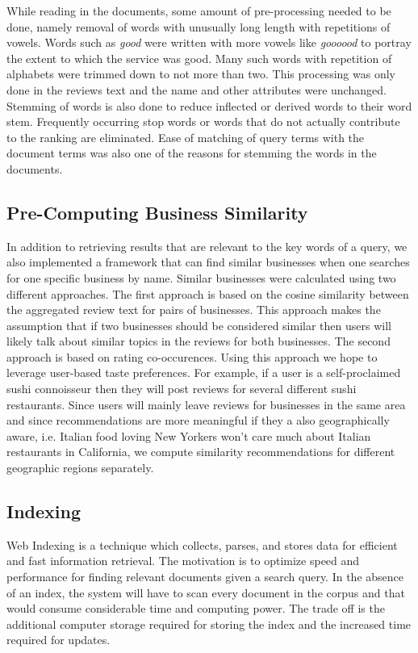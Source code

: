 \documentclass[paper=letter, fontsize=15pt]{article} %
\begin{document}
While reading in the documents, some amount of pre-processing needed to be done, namely removal of words with unusually long length with repetitions of vowels. Words such as \textit{good} were written with more vowels like \textit{goooood} to portray the extent to which the service was good. Many such words with repetition of alphabets were trimmed down to not more than two. This processing was only done in the reviews text and the name and other attributes were unchanged. Stemming\cite{sstem} of words is also done to  reduce inflected or derived words to their word stem. Frequently occurring stop words or words that do not actually contribute to the ranking are eliminated. Ease of matching of query terms with the document terms was also one of the reasons for stemming the words in the documents.

\subsection{Pre-Computing Business Similarity}
In addition to retrieving results that are relevant to the key words of a query, we also implemented a framework that can find similar businesses when one searches for one specific business by name. Similar businesses were calculated using two different approaches. The first approach is based on the cosine similarity between the aggregated review text for pairs of businesses. This approach makes the assumption that if two businesses should be considered similar then users will likely talk about similar topics in the reviews for both businesses. The second approach is based on rating co-occurences. Using this approach we hope to leverage user-based taste preferences. For example, if a user is a self-proclaimed sushi connoisseur then they will post reviews for several different sushi restaurants. Since users will mainly leave reviews for businesses in the same area and since recommendations are more meaningful if they a also geographically aware, i.e. Italian food loving New Yorkers won't care much about Italian restaurants in California, we compute similarity recommendations for different geographic regions separately.

\subsection{Indexing}
Web Indexing\cite{sindex} is a technique which collects, parses, and stores data for efficient and fast information retrieval. The motivation  is to optimize speed and performance for finding relevant documents given a search query. In the absence of an index, the system will have to scan every document in the corpus and that would consume considerable time and computing power. The trade off  is the additional computer storage required for storing the index and the increased time required for updates. 
\end{document}
